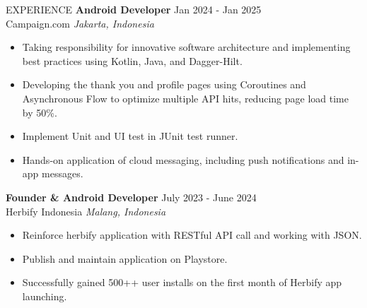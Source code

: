 \documentclass{resume} %
\begin{document}
\begin{rSection}{EXPERIENCE}
\textbf{Android Developer} \hfill Jan 2024 - Jan 2025 \\
Campaign.com \hfill \textit{Jakarta, Indonesia}
\vspace{-0.75em}
\begin{itemize}
\itemsep -7pt {}
\item Taking responsibility for innovative software architecture and implementing best practices using Kotlin, Java, and Dagger-Hilt.
\item Developing the thank you and profile pages using Coroutines and Asynchronous Flow to optimize multiple API hits, reducing page load time by 50\%.
\item Implement Unit and UI test in JUnit test runner.
\item Hands-on application of cloud messaging, including push notifications and in-app messages.
 \end{itemize}
 \vspace{-0.5em}

\textbf{Founder \& Android Developer} \hfill July 2023 - June 2024
\\ Herbify Indonesia \hfill \textit{Malang, Indonesia}
\vspace{-0.75em}
\begin{itemize}
\itemsep -7pt {}
\item Reinforce herbify application with RESTful API call and working with JSON.
\item Publish and maintain application on Playstore.
\item Successfully gained 500++ user installs on the first month of Herbify app launching.
 \end{itemize}
 \vspace{-0.5em}

\end{rSection} 
\end{document}
